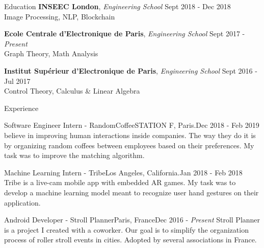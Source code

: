 \documentclass{resume} %
\begin{document}

	\begin{rSection}{Education}
		{\bf INSEEC London}, {\em Engineering School} \hfill {Sept 2018 - Dec 2018}
		\\ Image Processing, NLP, Blockchain

		{\bf Ecole Centrale d'Electronique de Paris}, {\em Engineering School} \hfill {Sept 2017 - \em Present}
		\\ Graph Theory, Math Analysis

		{\bf Institut Supérieur d'Electronique de Paris}, {\em Engineering School} \hfill {Sept 2016 - Jul 2017}
		\\ Control Theory, Calculus \& Linear Algebra
	\end{rSection}



	\begin{rSection}{Experience}
		\begin{event}{Software Engineer Intern - RandomCoffee}{STATION F, Paris.}{Dec 2018 - Feb 2019}{
			 believe in improving human interactions inside companies. The way they do it is by organizing random coffees between employees based on their preferences. My task was to improve the matching algorithm.
		}
		\end{event}

		\begin{event}{Machine Learning Intern - Tribe}{Los Angeles, California.}{Jan 2018 - Feb 2018}{
			Tribe is a live-cam mobile app with embedded AR games. My task was to develop a machine learning model meant to recognize user hand gestures on their application.
		}
		\end{event}

		\begin{event}{Android Developer - Stroll Planner}{Paris, France}{Dec 2016 - \em Present}{
			Stroll Planner is a project I created with a coworker. Our goal is to simplify the organization process of roller stroll events in cities. Adopted by several associations in France. 
		}
		\end{event}
	\end{rSection}
\end{document}
